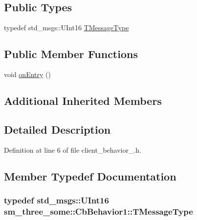 \subsection*{Public Types}
\begin{DoxyCompactItemize}
\item 
typedef std\+\_\+msgs\+::\+U\+Int16 \hyperlink{classsm__three__some_1_1CbBehavior1_a386ade05f539de5e1e96967482987ec7}{T\+Message\+Type}
\end{DoxyCompactItemize}
\subsection*{Public Member Functions}
\begin{DoxyCompactItemize}
\item 
void \hyperlink{classsm__three__some_1_1CbBehavior1_a6cf4b84d690a925083bbe38f28830fd6}{on\+Entry} ()
\end{DoxyCompactItemize}
\subsection*{Additional Inherited Members}


\subsection{Detailed Description}


Definition at line 6 of file client\+\_\+behavior\+\_.\+h.



\subsection{Member Typedef Documentation}
\subsubsection[{\texorpdfstring{T\+Message\+Type}{TMessageType}}]{\setlength{\rightskip}{0pt plus 5cm}typedef std\+\_\+msgs\+::\+U\+Int16 {\bf sm\+\_\+three\+\_\+some\+::\+Cb\+Behavior1\+::\+T\+Message\+Type}}\hypertarget{classsm__three__some_1_1CbBehavior1_a386ade05f539de5e1e96967482987ec7}{}\label{classsm__three__some_1_1CbBehavior1_a386ade05f539de5e1e96967482987ec7}


